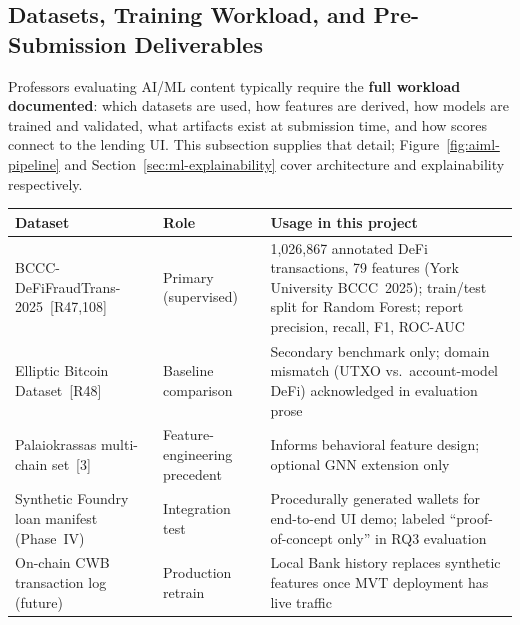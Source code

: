\documentclass[12pt,a4paper]{report}
\newcommand{\tableheadcolor}{\rowcolor{TableHeadBg}}
\begin{document}
\subsection{Datasets, Training Workload, and Pre-Submission Deliverables}
\label{sec:ml-workload}

Professors evaluating AI/ML content typically require the \textbf{full workload documented}: which datasets are used, how features are derived, how models are trained and validated, what artifacts exist at submission time, and how scores connect to the lending UI. This subsection supplies that detail; Figure~\ref{fig:aiml-pipeline} and Section~\ref{sec:ml-explainability} cover architecture and explainability respectively.

\begin{table}[H]
\centering
\begin{tabular}{p{3.4cm}p{2.2cm}p{7.6cm}}
\toprule
\tableheadcolor
\textbf{Dataset} & \textbf{Role} & \textbf{Usage in this project} \\
\midrule
BCCC-DeFiFraudTrans-2025~[R47,108] & Primary (supervised) & 1,026,867 annotated DeFi transactions, 79 features (York University BCCC~2025); train/test split for Random Forest; report precision, recall, F1, ROC-AUC \\
Elliptic Bitcoin Dataset~[R48] & Baseline comparison & Secondary benchmark only; domain mismatch (UTXO vs.\ account-model DeFi) acknowledged in evaluation prose \\
Palaiokrassas multi-chain set~[3] & Feature-engineering precedent & Informs behavioral feature design; optional GNN extension only \\
Synthetic Foundry loan manifest (Phase~IV) & Integration test & Procedurally generated wallets for end-to-end UI demo; labeled ``proof-of-concept only'' in RQ3 evaluation \\
On-chain CWB transaction log (future) & Production retrain & Local Bank history replaces synthetic features once MVT deployment has live traffic \\
\bottomrule
\end{tabular}
\end{table}
\end{document}
